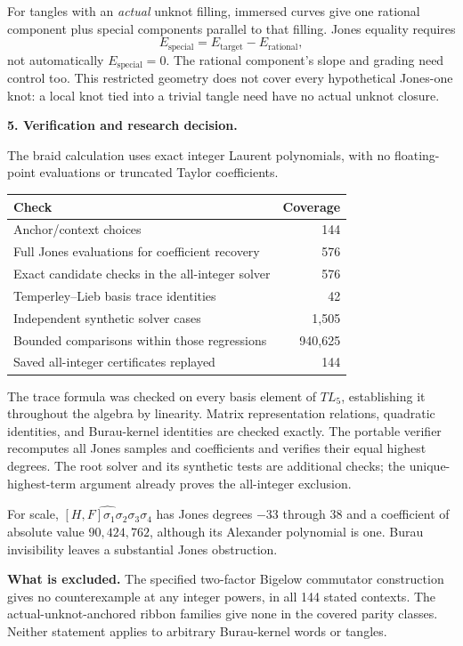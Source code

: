 \documentclass[11pt]{article}
\begin{document}
For tangles with an \emph{actual} unknot filling, immersed curves give one rational component plus special components parallel to that filling. Jones equality requires
\[
E_{\mathrm{special}}=E_{\mathrm{target}}-E_{\mathrm{rational}},
\]
not automatically $E_{\mathrm{special}}=0$. The rational component's slope and grading need control too. This restricted geometry does not cover every hypothetical Jones-one knot: a local knot tied into a trivial tangle need have no actual unknot closure.

\newpage
\textbf{5. Verification and research decision.}

The braid calculation uses exact integer Laurent polynomials, with no floating-point evaluations or truncated Taylor coefficients.

\begin{center}
\begin{tabular}{lr}
\toprule
Check & Coverage\\
\midrule
Anchor/context choices & 144\\
Full Jones evaluations for coefficient recovery & 576\\
Exact candidate checks in the all-integer solver & 576\\
Temperley--Lieb basis trace identities & 42\\
Independent synthetic solver cases & 1,505\\
Bounded comparisons within those regressions & 940,625\\
Saved all-integer certificates replayed & 144\\
\bottomrule
\end{tabular}
\end{center}

The trace formula was checked on every basis element of $TL_5$, establishing it throughout the algebra by linearity. Matrix representation relations, quadratic identities, and Burau-kernel identities are checked exactly. The portable verifier recomputes all Jones samples and coefficients and verifies their equal highest degrees. The root solver and its synthetic tests are additional checks; the unique-highest-term argument already proves the all-integer exclusion.

For scale, $\widehat{[H,F]\sigma_1\sigma_2\sigma_3\sigma_4}$ has Jones degrees $-33$ through $38$ and a coefficient of absolute value $90{,}424{,}762$, although its Alexander polynomial is one. Burau invisibility leaves a substantial Jones obstruction.

\textbf{What is excluded.}
The specified two-factor Bigelow commutator construction gives no counterexample at any integer powers, in all 144 stated contexts. The actual-unknot-anchored ribbon families give none in the covered parity classes. Neither statement applies to arbitrary Burau-kernel words or tangles.
\end{document}
